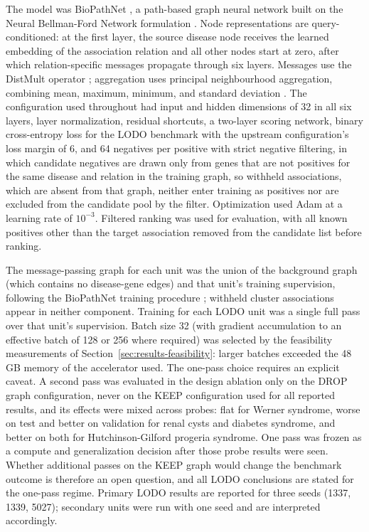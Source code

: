 \documentclass[11pt]{article}
\begin{document}
The model was BioPathNet \cite{hu2026}, a path-based graph neural network built on the Neural Bellman-Ford Network formulation \cite{zhu2021}. Node representations are query-conditioned: at the first layer, the source disease node receives the learned embedding of the association relation and all other nodes start at zero, after which relation-specific messages propagate through six layers. Messages use the DistMult operator \cite{yang2015}; aggregation uses principal neighbourhood aggregation, combining mean, maximum, minimum, and standard deviation \cite{corso2020}. The configuration used throughout had input and hidden dimensions of 32 in all six layers, layer normalization, residual shortcuts, a two-layer scoring network, binary cross-entropy loss for the LODO benchmark with the upstream configuration's loss margin of 6, and 64 negatives per positive with strict negative filtering, in which candidate negatives are drawn only from genes that are not positives for the same disease and relation in the training graph, so withheld associations, which are absent from that graph, neither enter training as positives nor are excluded from the candidate pool by the filter. Optimization used Adam \cite{kingma2015} at a learning rate of $10^{-3}$. Filtered ranking was used for evaluation, with all known positives other than the target association removed from the candidate list before ranking.

The message-passing graph for each unit was the union of the background graph (which contains no disease-gene edges) and that unit's training supervision, following the BioPathNet training procedure \cite{hu2026}; withheld cluster associations appear in neither component. Training for each LODO unit was a single full pass over that unit's supervision. Batch size 32 (with gradient accumulation to an effective batch of 128 or 256 where required) was selected by the feasibility measurements of Section~\ref{sec:results-feasibility}: larger batches exceeded the 48 GB memory of the accelerator used. The one-pass choice requires an explicit caveat. A second pass was evaluated in the design ablation only on the DROP graph configuration, never on the KEEP configuration used for all reported results, and its effects were mixed across probes: flat for Werner syndrome, worse on test and better on validation for renal cysts and diabetes syndrome, and better on both for Hutchinson-Gilford progeria syndrome. One pass was frozen as a compute and generalization decision after those probe results were seen. Whether additional passes on the KEEP graph would change the benchmark outcome is therefore an open question, and all LODO conclusions are stated for the one-pass regime. Primary LODO results are reported for three seeds (1337, 1339, 5027); secondary units were run with one seed and are interpreted accordingly.
\end{document}
